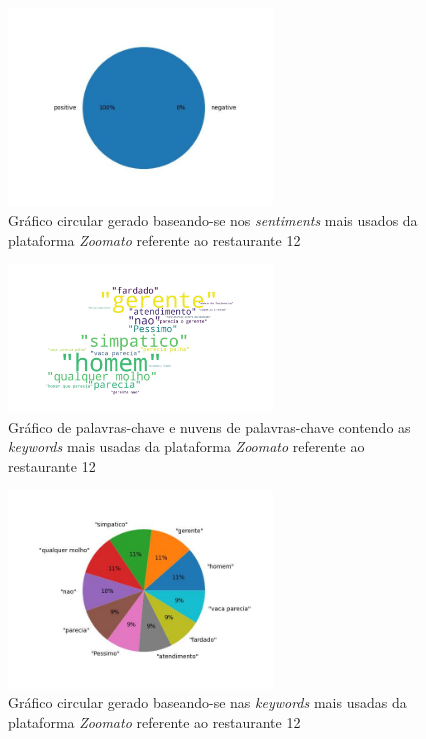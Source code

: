 \begin{figure}[!htb]
\centering
\includegraphics[width=7cm]{figuras/Zoomato/Restaurants/restaurante12_sentiments.jpeg}
\caption{Gráfico circular gerado baseando-se nos \textit{sentiments} mais usados da plataforma \textit{Zoomato} referente ao restaurante 12}
\label{fig:exemplofig}
\end{figure}

\begin{figure}[!htb]
\centering
\includegraphics[width=7cm]{figuras/Zoomato/Restaurants/restaurante12_keywordcloud.jpeg}
\caption{Gráfico de palavras-chave e nuvens de palavras-chave contendo as \textit{keywords} mais usadas da plataforma \textit{Zoomato} referente ao restaurante 12}
\label{fig:exemplofig}
\end{figure}

\begin{figure}[!htb]
\centering
\includegraphics[width=7cm]{figuras/Zoomato/Restaurants/restaurante12_keywords.jpeg}
\caption{Gráfico circular gerado baseando-se nas \textit{keywords} mais usadas da plataforma \textit{Zoomato} referente ao restaurante 12}
\label{fig:exemplofig}
\end{figure}

